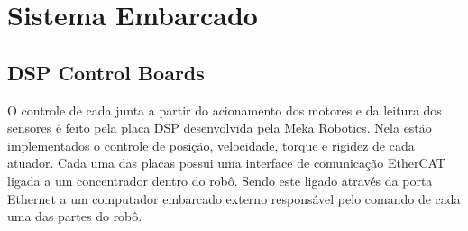 





\section{Sistema Embarcado}

\subsection{DSP Control Boards}
O controle de cada junta a partir do acionamento dos motores e da leitura dos sensores é feito pela placa DSP desenvolvida pela Meka Robotics. Nela estão implementados o controle de posição, velocidade, torque e rigidez de cada atuador. Cada uma das placas possui uma interface de comunicação EtherCAT ligada a um concentrador dentro do robô. Sendo este ligado através da porta Ethernet a um computador embarcado externo responsável pelo comando de cada uma das partes do robô.


